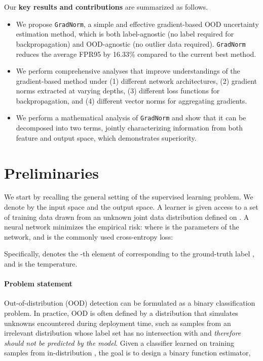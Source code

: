 \documentclass{article}
\begin{document}
Our \textbf{key results and contributions} are summarized as follows. 
\begin{itemize}
\item We propose \texttt{GradNorm}, a simple and effective gradient-based OOD uncertainty estimation method, which is both label-agnostic (no label required for backpropagation) and OOD-agnostic (no outlier data required). \texttt{GradNorm} reduces the average FPR95 by {16.33\%} compared to the current best method.
\item We perform comprehensive analyses that improve understandings of the gradient-based method under (1) different network architectures, (2) gradient norms extracted at varying depths, (3) different loss functions for backpropagation, and (4) different vector norms for aggregating gradients. 
\item We perform a mathematical analysis of \texttt{GradNorm} and show that it can be decomposed into two terms, jointly characterizing information from both feature and output space, which demonstrates superiority. 
\end{itemize}




















\vspace{-0.2cm}
\section{Preliminaries}
\label{sec:background}
\vspace{-0.2cm}
We start by recalling the general setting of the supervised learning problem. We denote by  the input space and  the output space. A learner is given access to a set of training data  drawn from an unknown joint data distribution  defined on . A neural network  minimizes the empirical risk: 
where  is the parameters of the network, and  is the commonly used cross-entropy loss:

Specifically,  denotes the -th element of  corresponding to the ground-truth label , and  is the temperature.

\vspace{-0.2cm}
\paragraph{Problem statement}
Out-of-distribution (OOD) detection can be formulated as a binary classification problem. In practice, OOD is often defined by a distribution that simulates unknowns encountered during deployment time, such as samples from an irrelevant distribution whose label set has no intersection with  and \emph{therefore should not be predicted by the model}.  Given a classifier  learned on training samples from in-distribution , the goal is to design a binary function estimator,
\end{document}
